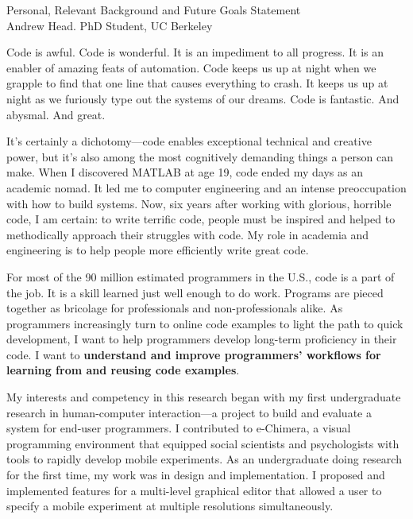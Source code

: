 \documentclass[12pt]{memoir}
\title{}
\author{Andrew Head}
\begin{document}
\begin{center}
Personal, Relevant Background and Future Goals Statement \\
Andrew Head. PhD Student, UC Berkeley
\end{center}
\vspace{-1ex}


Code is awful.
Code is wonderful.
It is an impediment to all progress.
It is an enabler of amazing feats of automation.
Code keeps us up at night when we grapple to find that one line that causes everything to crash.
It keeps us up at night as we furiously type out the systems of our dreams.
Code is fantastic.
And abysmal.
And great.

It's certainly a dichotomy---code enables exceptional technical and creative power, but it's also among the most cognitively demanding things a person can make.
When I discovered MATLAB at age 19, code ended my days as an academic nomad.
It led me to computer engineering and an intense preoccupation with how to build systems.
Now, six years after working with glorious, horrible code, I am certain:
to write terrific code, people must be inspired and helped to methodically approach their struggles with code.
My role in academia and engineering is to help people more efficiently write great code.

For most of the 90 million estimated programmers in the U.S., code is a part of the job.
It is a skill learned just well enough to do work.
Programs are pieced together as bricolage for professionals and non-professionals alike.
As programmers increasingly turn to online code examples to light the path to quick development, I want to help programmers develop long-term proficiency in their code.
I want to \textbf{understand and improve programmers' workflows for learning from and reusing code examples}.


My interests and competency in this research began with my first undergraduate research in human-computer interaction---a project to build and evaluate a system for end-user programmers.
I contributed to e-Chimera, a visual programming environment that equipped social scientists and psychologists with tools to rapidly develop mobile experiments.
As an undergraduate doing research for the first time, my work was in design and implementation.
I proposed and implemented features for a multi-level graphical editor that allowed a user to specify a mobile experiment at multiple resolutions simultaneously.
\end{document}
